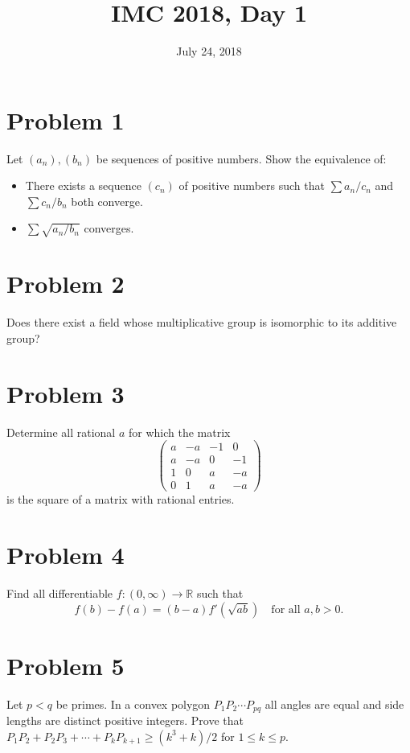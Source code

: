 \documentclass{article}
\title{IMC 2018, Day 1}
\date{July 24, 2018}
\begin{document}
\maketitle

\section*{Problem 1}
Let $(a_n), (b_n)$ be sequences of positive numbers. Show the equivalence of:
\begin{itemize}
\item[(1)] There exists a sequence $(c_n)$ of positive numbers such that $\sum a_n/c_n$ and $\sum c_n/b_n$ both converge.
\item[(2)] $\sum \sqrt{a_n/b_n}$ converges.
\end{itemize}

\section*{Problem 2}
Does there exist a field whose multiplicative group is isomorphic to its additive group?

\section*{Problem 3}
Determine all rational $a$ for which the matrix
\[ \begin{pmatrix} a & -a & -1 & 0 \\ a & -a & 0 & -1 \\ 1 & 0 & a & -a \\ 0 & 1 & a & -a \end{pmatrix} \]
is the square of a matrix with rational entries.

\section*{Problem 4}
Find all differentiable $f : (0, \infty) \to \mathbb{R}$ such that
\[ f(b) - f(a) = (b - a) f'(\sqrt{ab}) \quad \text{for all } a, b > 0. \]

\section*{Problem 5}
Let $p < q$ be primes. In a convex polygon $P_1 P_2 \cdots P_{pq}$ all angles are equal and side lengths are distinct positive integers. Prove that $P_1 P_2 + P_2 P_3 + \cdots + P_k P_{k+1} \geq (k^3 + k)/2$ for $1 \leq k \leq p$.
\end{document}
